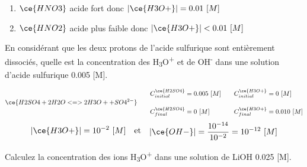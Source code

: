 \documentclass[
  11pt,
  french,
  a4paper,
  openany]{book}
\providecommand{\tightlist}{%
  \setlength{\itemsep}{0pt}\setlength{\parskip}{0pt}}
\begin{document}
\begin{Answer}

\begin{enumerate}
\def\labelenumi{\alph{enumi}.}
\tightlist
\item
  \(\ce{HNO3}\) acide fort donc \(|\ce{H3O+}| = 0.01\ [M]\)
  \vspace{1em}
\item
  \(\ce{HNO2}\) acide plus faible donc \(|\ce{H3O+}| < 0.01\ [M]\)
  \vspace{1em}
\end{enumerate}


\end{Answer}

\clearpage

\begin{Exercise}
En considérant que les deux protons de l'acide sulfurique sont entièrement dissociés, quelle est la concentration des H\textsubscript{3}O\textsuperscript{+} et de OH\textsuperscript{-} dans une solution d'acide sulfurique 0.005 {[}M{]}.

\end{Exercise}

\begin{Answer}
\[
\begin{split}
\ce{H2SO4 + 2 H2O <=> 2 H3O+ + SO4^{2-}}
\end{split}
\qquad
\begin{split}
C_{initial}^{\ce{H2SO4}} &= 0.005\ [M] \\[1em]
C_{final}^{\ce{H2SO4}} &= 0\ [M]
\end{split}
\qquad
\begin{split}
C_{initial}^{\ce{H3O+}} &= 0\ [M] \\[1em]
C_{final}^{\ce{H3O+}} &= 0.010\ [M]
\end{split}
\]
\[
\begin{split}
|\ce{H3O+}| = 10^{-2}\ [M]
\end{split}
\quad \text{et} \quad
\begin{split}
|\ce{OH-}| = \frac{10^{-14}}{10^{-2}} = 10^{-12}\ [M]
\end{split}
\]

\end{Answer}

\begin{Exercise}
Calculez la concentration des ions H\textsubscript{3}O\textsuperscript{+} dans une solution de LiOH 0.025 {[}M{]}.

\end{Exercise}
\end{document}
